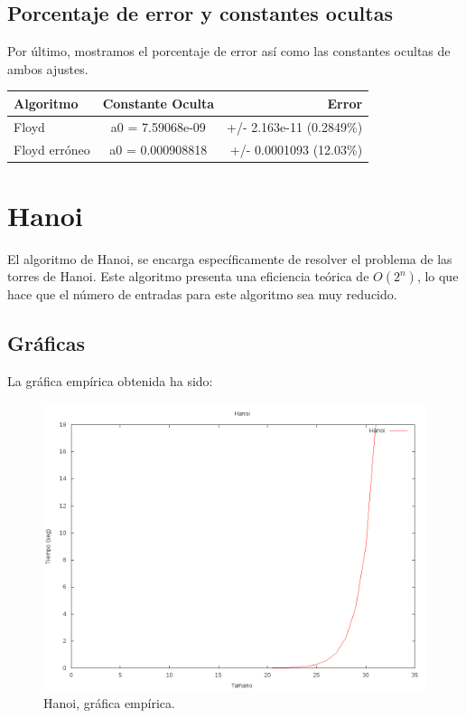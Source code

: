 \subsection{Porcentaje de error y constantes ocultas}
Por último, mostramos el porcentaje de error así como las constantes ocultas de ambos ajustes.\\

\begin{center}
	\begin{tabular}{| l | c | r |}
		\hline
		\textbf{Algoritmo} & \textbf{Constante Oculta} & \textbf{Error} \\ \hline
		Floyd & a0 = 7.59068e-09 & +/- 2.163e-11    (0.2849\%)\\ \hline
		Floyd erróneo & a0 = 0.000908818 & +/- 0.0001093 (12.03\%) \\ \hline
	\end{tabular}
\end{center}



\section{Hanoi}

El algoritmo de Hanoi, se encarga específicamente de resolver el problema de las torres de Hanoi. Este algoritmo presenta una eficiencia teórica de $O(2^n)$, lo que hace que el número de entradas para este algoritmo sea muy reducido.

\subsection{Gráficas}
La gráfica empírica obtenida ha sido:
\begin{figure}[H]
	\centering
	\includegraphics[scale=0.5]{imagenes/hanoiLines.png}
	\caption{Hanoi, gráfica empírica.}
	\label{fig:E19}
\end{figure}

